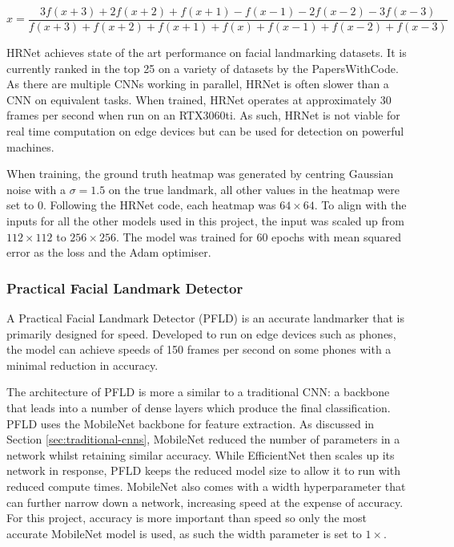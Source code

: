 \begin{equation}
    \label{eq:com7}
    \hat{x} = \frac{3f(x+3)+2f(x+2)+f(x+1)-f(x-1)-2f(x-2)-3f(x-3)}{f(x+3)+f(x+2)+f(x+1)+f(x)+f(x-1)+f(x-2)+f(x-3)}
\end{equation}

HRNet achieves state of the art performance on facial landmarking datasets. It is currently ranked in the top 25 on a variety of datasets by the PapersWithCode\cite{paperswithcodehrnet}. As there are multiple CNNs working in parallel, HRNet is often slower than a CNN on equivalent tasks. When trained, HRNet operates at approximately 30 frames per second when run on an RTX3060ti. As such, HRNet is not viable for real time computation on edge devices but can be used for detection on powerful machines.

When training, the ground truth heatmap was generated by centring Gaussian noise with a $\sigma=1.5$ on the true landmark, all other values in the heatmap were set to 0. Following the HRNet code\cite{zhao2019facial}, each heatmap was $64\times64$. To align with the inputs for all the other models used in this project, the input was scaled up from $112\times112$ to $256\times256$. The model was trained for 60 epochs with mean squared error as the loss and the Adam\cite{kingma2014adam} optimiser.


\subsubsection{Practical Facial Landmark Detector}


A Practical Facial Landmark Detector (PFLD)\cite{guo2019pfld} is an accurate landmarker that is primarily designed for speed. Developed to run on edge devices such as phones, the model can achieve speeds of 150 frames per second on some phones with a minimal reduction in accuracy.

The architecture of PFLD is more a similar to a traditional CNN: a backbone that leads into a number of dense layers which produce the final classification. PFLD uses the MobileNet backbone\cite{howard2017mobilenets} for feature extraction. As discussed in Section \ref{sec:traditional-cnns}, MobileNet reduced the number of parameters in a network whilst retaining similar accuracy. While EfficientNet then scales up its network in response, PFLD keeps the reduced model size to allow it to run with reduced compute times. MobileNet also comes with a width hyperparameter that can further narrow down a network, increasing speed at the expense of accuracy. For this project, accuracy is more important than speed so only the most accurate MobileNet model is used, as such the width parameter is set to $1\times$. 

